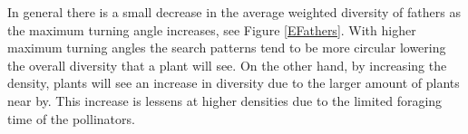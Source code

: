 In general there is a small decrease in the average weighted diversity of fathers as the maximum
turning angle increases, see Figure \ref{EFathers}. With higher maximum turning angles the search
patterns tend to be more circular lowering the overall diversity that a plant will see.  On the
other hand, by increasing the density, plants will see an increase in diversity due to the larger
amount of plants near by.  This increase is lessens at higher densities due to the limited foraging
time of the pollinators.
